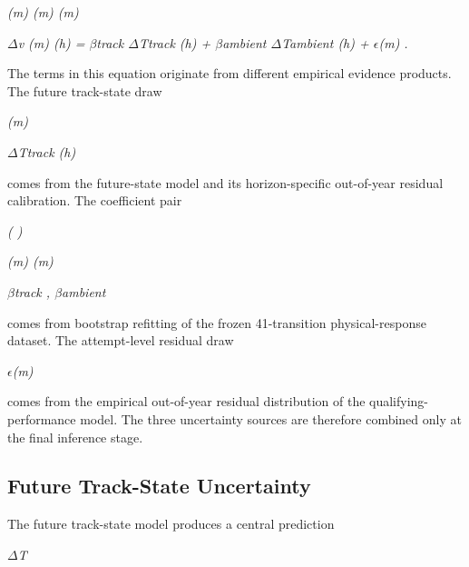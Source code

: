 \begin{center}\textit{(m)     (m)                (m)}\end{center}

\begin{center}\textit{\ensuremath{\Delta}v (m) (h) = \ensuremath{\beta}track \ensuremath{\Delta}Ttrack (h) + \ensuremath{\beta}ambient \ensuremath{\Delta}Tambient (h) + \ensuremath{\epsilon}(m) .}\end{center}

The terms in this equation originate from different empirical evidence products. The future track-state draw

\begin{center}\textit{(m)}\end{center}

\begin{center}\textit{\ensuremath{\Delta}Ttrack (h)}\end{center}

comes from the future-state model and its horizon-specific out-of-year residual calibration. The coefficient pair

\begin{center}\textit{(                       )}\end{center}

\begin{center}\textit{(m)     (m)}\end{center}

\begin{center}\textit{\ensuremath{\beta}track , \ensuremath{\beta}ambient}\end{center}

comes from bootstrap refitting of the frozen 41-transition physical-response dataset. The attempt-level residual draw

\begin{center}\textit{\ensuremath{\epsilon}(m)}\end{center}

comes from the empirical out-of-year residual distribution of the qualifying-performance model. The three uncertainty sources are therefore combined only at the final inference stage.

\subsection{Future Track-State Uncertainty}
The future track-state model produces a central prediction

\begin{center}\textit{\ensuremath{\Delta}T}\end{center}

